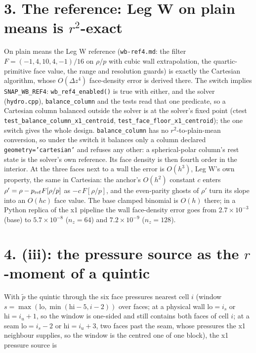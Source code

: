 \documentclass[11pt,a4paper]{article}
\begin{document}
\section*{3. The reference: Leg W on plain means is $r^2$-exact}

On plain means the Leg W reference (\texttt{wb-ref4.md}: the filter $F = (-1,4,10,4,-1)/16$ on $\rho/p$ with cubic
wall extrapolation, the quartic-primitive face value, the range and resolution guards) is exactly the
Cartesian algorithm, whose $O(\Delta z^4)$ face-density error is derived there. The switch implies
\texttt{SNAP\_WB\_REF4}: \texttt{wb\_ref4\_enabled()} is true with either, and the solver (\texttt{hydro.cpp}), \texttt{balance\_column} and the
tests read that one predicate, so a Cartesian column balanced outside the solver is at the solver's fixed point
(ctest \texttt{test\_balance\_column\_x1\_centroid}, \texttt{test\_face\_floor\_x1\_centroid}); the one switch gives the whole design.
\texttt{balance\_column} has no $r^2$-to-plain-mean conversion, so under the switch it balances only a column declared
\texttt{geometry='cartesian'} and refuses any other: a spherical-polar column's rest state is the solver's own reference. Its face density is then fourth order in the interior. At the three faces
next to a wall the error is $O(h^3)$, Leg W's own property, the same in Cartesian: the anchor's $O(h^2)$
constant $c$ enters $\rho' = \rho - p_{\rm ref} F[\rho/p]$ as $-c\,F[\rho/p]$, and the even-parity ghosts of
$\rho'$ turn its slope into an $O(h c)$ face value. The base clamped binomial is $O(h)$ there; in a Python replica of the x1
pipeline the wall face-density error goes from $2.7\times10^{-3}$ (base) to
$5.7\times10^{-8}$ ($n_z = 64$) and $7.2\times10^{-9}$ ($n_z = 128$).

\section*{4. (iii): the pressure source as the $r$-moment of a quintic}

With $\tilde p$ the quintic through the six face pressures nearest cell $i$ (window
$s = \max(\mathrm{lo}, \min(\mathrm{hi} - 5, i - 2))$ over faces; at a physical wall $\mathrm{lo} = i_s$ or
$\mathrm{hi} = i_u + 1$, so the window is one-sided and still contains both faces of cell $i$; at a seam
$\mathrm{lo} = i_s - 2$ or $\mathrm{hi} = i_u + 3$, two faces past the seam, whose pressures the x1 neighbour
supplies, so the window is the centred one of one block), the x1 pressure source is
\end{document}

